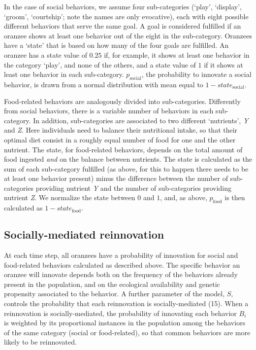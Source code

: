 \documentclass[9pt,twocolumn,twoside,]{pnas-new}
\begin{document}
In the case of social behaviors, we assume four sub-categories (`play',
`display', `groom', `courtship'; note the names are only evocative),
each with eight possible different behaviors that serve the same goal. A
goal is considered fulfilled if an oranzee shows at least one behavior
out of the eight in the sub-category. Oranzees have a `state' that is
based on how many of the four goals are fulfilled. An oranzee has a
state value of \(0.25\) if, for example, it shows at least one behavior
in the category `play', and none of the others, and a state value of
\(1\) if it shows at least one behavior in each sub-category.
\(p_\text{social}\), the probability to innovate a social behavior, is
drawn from a normal distribution with mean equal to
\(1-state_\text{social}\).

Food-related behaviors are analogously divided into sub-categories.
Differently from social behaviors, there is a variable number of
behaviors in each sub-category. In addition, sub-categories are
associated to two different `nutrients', \emph{Y} and \emph{Z}. Here
individuals need to balance their nutritional intake, so that their
optimal diet consist in a roughly equal number of food for one and the
other nutrient. The state, for food-related behaviors, depends on the
total amount of food ingested \emph{and} on the balance between
nutrients. The state is calculated as the sum of each sub-category
fulfilled (as above, for this to happen there needs to be at least one
behavior present) minus the difference between the number of
sub-categories providing nutrient \emph{Y} and the number of
sub-categories providing nutrient \emph{Z}. We normalize the state
between \(0\) and \(1\), and, as above, \(p_\text{food}\) is then
calculated as \(1-state_\text{food}\).

\subsection*{Socially-mediated reinnovation}\label{format}

At each time step, all oranzees have a probability of innovation for
social and food-related behaviors calculated as described above. The
specific behavior an oranzee will innovate depends both on the frequency
of the behaviors already present in the population, and on the
ecological availability and genetic propensity associated to the
behavior. A further parameter of the model, \(S\), controls the
probability that each reinnovation is socially-mediated (15). When a
reinnovation is socially-mediated, the probability of innovating each
behavior \(B_i\) is weighted by its proportional instances in the
population among the behaviors of the same category (social or
food-related), so that common behaviors are more likely to be
reinnovated.
\end{document}
